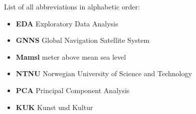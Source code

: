 
List of all abbreviations in alphabetic order:

\begin{itemize}
    \item \textbf{EDA} Exploratory Data Analysis
    \item \textbf{GNNS} Global Navigation Satellite System
    \item \textbf{Mamsl} meter above mean sea level
    \item \textbf{NTNU} Norwegian University of Science and Technology
    \item \textbf{PCA} Principal Component Analysis
    \item \textbf{KUK} Kunst und Kultur
    
\end{itemize}